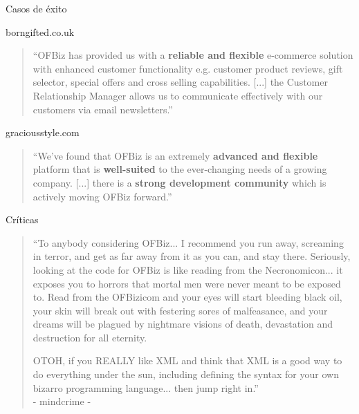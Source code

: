 \begin{frame}{Casos de éxito}
	\begin{block}{borngifted.co.uk}
		\begin{quotation}
			``OFBiz has provided us with a \textbf{reliable and flexible}
			e-commerce solution with enhanced customer functionality e.g.
			customer product reviews, gift selector, special offers and cross
			selling capabilities. [...] the Customer Relationship Manager
			allows us to communicate effectively with our customers
			via email newsletters.''\\
		\end{quotation}
	\end{block}
	\begin{block}{graciousstyle.com}
		\begin{quotation} 
			``We've found that OFBiz is an extremely
			\textbf{advanced and flexible} platform that is
			\textbf{well-suited} to the ever-changing needs of a growing
			company. [...] there is a \textbf{strong development community}
			which is actively moving OFBiz forward.''
		\end{quotation}
	\end{block}
\end{frame}

\begin{frame}{Críticas}
	\begin{quotation}
		``To anybody considering OFBiz... I recommend you run away, screaming in
		terror, and get as far away from it as you can, and stay there.
		Seriously, looking at the code for OFBiz is like reading from the
		Necronomicon... it exposes you to horrors that mortal men were never
		meant to be exposed to. Read from the OFBizicom and your eyes will
		start bleeding black oil, your skin will break out with festering sores
		of malfeasance, and your dreams will be plagued by nightmare visions
		of death, devastation and destruction for all eternity.

		OTOH, if you REALLY like XML and think that XML is a good way
		to do everything under the sun, including defining the syntax for
		your own bizarro programming language... then jump right in.''\\
		- mindcrime -
	\end{quotation}
\end{frame}

